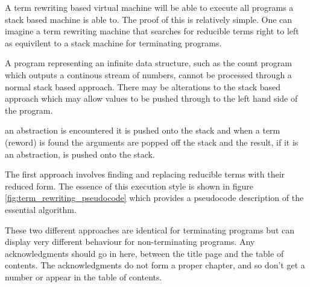 A term rewriting based virtual machine will be able to execute
all programs a stack based machine is able to. The proof of this
is relatively simple. One can imagine a term rewriting machine 
that searches for reducible terms right to left as equivilent to
a stack machine for terminating programs.



A program representing an infinite data structure, such as the count
program which outputs a continous stream of numbers, cannot be
processed through a normal stack based approach. There may be alterations
to the stack based approach which may allow values to be pushed 
through to the left hand side of the program.


an abstraction is
encountered it is pushed onto the stack and when a term (reword)
is found the arguments are popped off the stack and the 
result, if it is an abstraction, is pushed onto the stack.

The first approach involves finding and replacing
reducible terms with their reduced form. The essence of this
execution style is shown in figure 
\ref{fig:term_rewriting_pseudocode} which provides a pseudocode
description of the essential algorithm.

These two different approaches are identical for
terminating programs but can display very different behaviour
for non-terminating programs.
Any acknowledgments should go 
in here, between the title page and the table of contents.  The 
acknowledgments do not form a proper chapter, and so don't get a 
number or appear in the table of contents.
